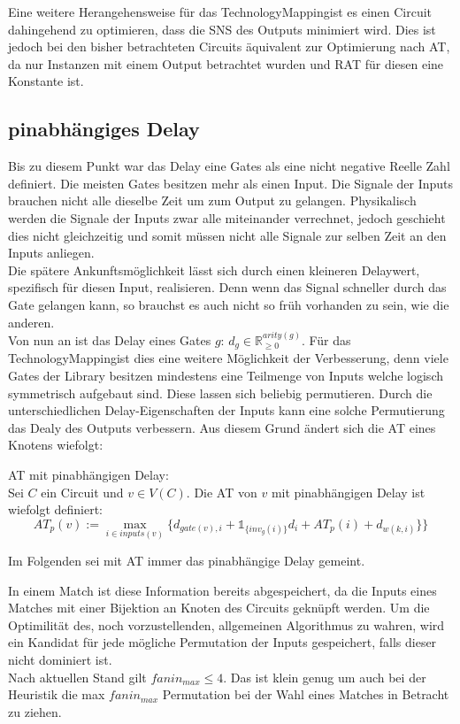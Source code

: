 \documentclass[11pt, a4paper, german]{article}
\newcommand{\TM}{TechnologyMapping}
\begin{document}
Eine weitere Herangehensweise für das \TM ist es einen Circuit dahingehend zu optimieren, dass die SNS des Outputs minimiert wird. Dies ist jedoch bei den bisher betrachteten Circuits äquivalent zur Optimierung nach AT, da nur Instanzen mit einem Output betrachtet wurden und RAT für diesen eine Konstante ist.

\subsection{pinabhängiges Delay}
\label{subsec:pinabh_delay}
Bis zu diesem Punkt war das Delay eine Gates als eine nicht negative Reelle Zahl definiert. Die meisten Gates besitzen mehr als einen Input. Die Signale der Inputs brauchen nicht alle dieselbe Zeit um zum Output zu gelangen. Physikalisch werden die Signale der Inputs zwar alle miteinander verrechnet, jedoch geschieht dies nicht gleichzeitig und somit müssen nicht alle Signale zur selben Zeit an den Inputs anliegen.\\
Die spätere Ankunftsmöglichkeit lässt sich durch einen kleineren Delaywert, spezifisch für diesen Input, realisieren. Denn wenn das Signal schneller durch das Gate gelangen kann, so brauchst es auch nicht so früh vorhanden zu sein, wie die anderen. \\
Von nun an ist das Delay eines Gates $g$: $d_g \in \mathbb{R}_{\geq 0}^{arity(g)}$. Für das \TM ist dies eine weitere Möglichkeit der Verbesserung, denn viele Gates der Library besitzen mindestens eine Teilmenge von Inputs welche logisch symmetrisch aufgebaut sind. Diese lassen sich beliebig permutieren. Durch die unterschiedlichen Delay-Eigenschaften der Inputs kann eine solche Permutierung das Dealy des Outputs verbessern. Aus diesem Grund ändert sich die AT eines Knotens wiefolgt: 
\begin{definition}{AT mit pinabhängigen Delay:}\\
	Sei $C$ ein Circuit und $v \in V(C)$. Die AT von $v$ mit pinabhängigen Delay ist wiefolgt definiert: \[ AT_p(v) :=  \max\limits_{i \in inputs(v)} \{   d_{gate(v),i} + \mathbb{1}_{\{inv_g(i) \}} d_{i} + AT_p(i) + d_{w(k,i)} \}   \}\]
\end{definition}
Im Folgenden sei mit AT immer das pinabhängige Delay gemeint.

In einem Match ist diese Information bereits abgespeichert, da die Inputs eines Matches mit einer Bijektion an Knoten des Circuits geknüpft werden. Um die Optimilität des, noch vorzustellenden, allgemeinen Algorithmus zu wahren, wird ein Kandidat für jede mögliche Permutation der Inputs gespeichert, falls dieser nicht dominiert ist.\\
Nach aktuellen Stand gilt $fanin_{max} \leq 4$. Das ist klein genug um auch bei der Heuristik die max $fanin_{max}$ Permutation bei der Wahl eines Matches in Betracht zu ziehen. 
\end{document}
